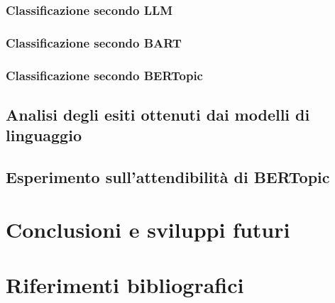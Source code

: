 \documentclass[12pt,a4paper,twoside]{book}
\begin{document}
\subsection{Classificazione secondo LLM}


\subsection{Classificazione secondo BART}


\subsection{Classificazione secondo BERTopic}
\label{4.2.3}


\section{Analisi degli esiti ottenuti dai modelli di linguaggio}


\section{Esperimento sull'attendibilità di BERTopic}
\label{4.4}


\chapter{Conclusioni e sviluppi futuri}
\label{5.0}


\renewcommand{\bibsection}{}
\chapter*{Riferimenti bibliografici}

\end{document}
